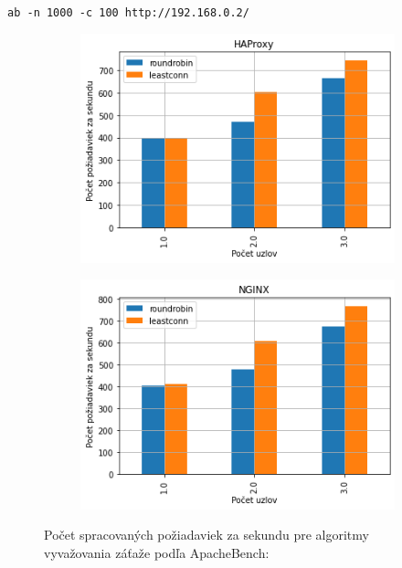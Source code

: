 \documentclass[12pt, a4paper]{article}
\begin{document}
\begin{lrbox}{\shield}
\verb|ab -n 1000 -c 100 http://192.168.0.2/|
\end{lrbox}
\begin{figure}[h!]
	\centering
	\begin{subfigure}[t]{.48\textwidth}
  		\centering
  		\includegraphics[width=\textwidth]{images/haproxy_ab_1000_100_requests.png}
	\end{subfigure}
	\begin{subfigure}[t]{.48\textwidth}
  		\centering
  		\includegraphics[width=\textwidth]{images/nginx_ab_1000_100_requests.png}
	\end{subfigure}
	\caption{Počet spracovaných požiadaviek za sekundu pre algoritmy vyvažovania 
	záťaže podľa ApacheBench: \usebox{\shield}}
	\label{ab-count}
\end{figure}
\end{document}
